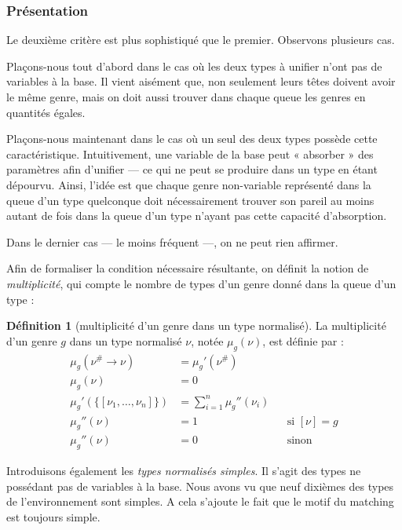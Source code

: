 \documentclass[a4paper]{report}
\theoremstyle{definition}
\newtheorem{definition}[theoreme]{Définition}
\newcommand{\mset}[1]{\{\![#1]\!\}}
\begin{document}
\subsubsection{Présentation}

Le deuxième critère est plus sophistiqué que le premier. Observons plusieurs cas.

Plaçons-nous tout d'abord dans le cas où les deux types à unifier n'ont pas de variables à la base. Il vient aisément que, non seulement leurs têtes doivent avoir le même genre, mais on doit aussi trouver dans chaque queue les genres en quantités égales.

Plaçons-nous maintenant dans le cas où un seul des deux types possède cette caractéristique. Intuitivement, une variable de la base peut « absorber » des paramètres afin d'unifier — ce qui ne peut se produire dans un type en étant dépourvu. Ainsi, l'idée est que chaque genre non-variable représenté dans la queue d'un type quelconque doit nécessairement trouver son pareil au moins autant de fois dans la queue d'un type n'ayant pas cette capacité d'absorption.

Dans le dernier cas — le moins fréquent —, on ne peut rien affirmer.

Afin de formaliser la condition nécessaire résultante, on définit la notion de \emph{multiplicité}, qui compte le nombre de types d'un genre donné dans la queue d'un type :

\begin{definition}[multiplicité d'un genre dans un type normalisé]
  La multiplicité d'un genre $g$ dans un type normalisé $\nu$, notée $\mu_g (\nu)$, est définie par :
  \begin{align*}
      \mu_g (\nu^\# \rightarrow \nu) &=
      \mu_g' (\nu^\#)
    \\
      \mu_g (\nu) &=
      0
    \\
      \mu_g' (\mset{\nu_1, \dots, \nu_n}) &=
      \sum_{i=1}^n \mu_g'' (\nu_i)
    \\
      \mu_g'' (\nu) &=
      1 &&
      \text{si } [\nu] = g
    \\
      \mu_g'' (\nu) &=
      0 &&
      \text{sinon}
  \end{align*}
\end{definition}

Introduisons également les \emph{types normalisés simples}. Il s'agit des types ne possédant pas de variables à la base. Nous avons vu que neuf dixièmes des types de l'environnement sont simples. A cela s'ajoute le fait que le motif du matching est toujours simple.
\end{document}
